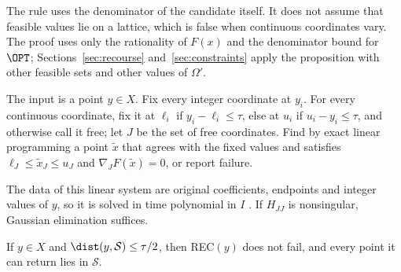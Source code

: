 The rule uses the denominator of the candidate itself. It does not assume
that feasible values lie on a lattice, which is false when continuous
coordinates vary. The proof uses only the rationality of $F(x)$ and the
denominator bound for $\OPT$; Sections~\ref{sec:recourse}
and~\ref{sec:constraints} apply the proposition with other feasible sets and
other values of $\Omega'$.

\begin{algorithm}\label{alg:rec}
The input is a point $y\in X$. Fix every integer coordinate at $y_i$. For
every continuous coordinate, fix it at $\ell_i$ if $y_i-\ell_i\le\tau$, else
at $u_i$ if $u_i-y_i\le\tau$, and otherwise call it free; let $J$ be the set
of free coordinates. Find by exact linear programming a point $\tilde x$ that
agrees with the fixed values and satisfies $\ell_J\le\tilde x_J\le u_J$ and
$\nabla_JF(\tilde x)=0$, or report failure.
\end{algorithm}

The data of this linear system are original coefficients, endpoints and
integer values of $y$, so it is solved in time polynomial in $I$
\cite[Theorem~6.4.12]{GrotschelLovaszSchrijver1988}. If $H_{JJ}$ is
nonsingular, Gaussian elimination suffices.

\begin{lemma}\label{lem:snap}
If $y\in X$ and $\dist(y,\mathcal S)\le\tau/2$, then REC$(y)$ does not fail,
and every point it can return lies in $\mathcal S$.
\end{lemma}

